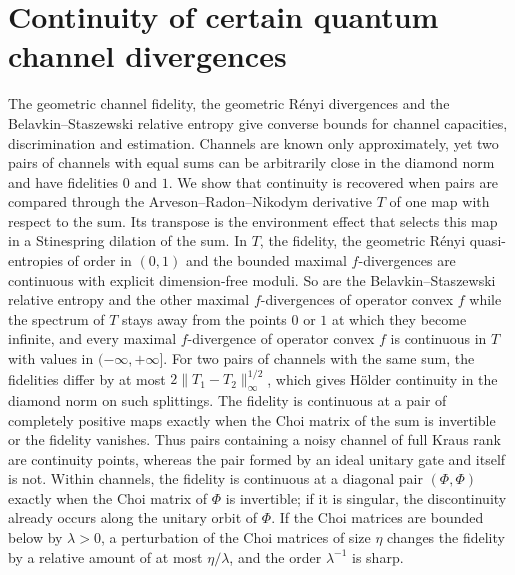 \chapter{Continuity of certain quantum channel divergences}\label{cont:chapter}
\begingroup\renewcommand{\thefootnote}{}\addtocounter{footnote}{-1}\endgroup
{}%
\begingroup

\begin{chaptersummary}
The geometric channel fidelity, the geometric R\'enyi divergences and the Belavkin--Staszewski relative entropy give converse bounds for channel capacities, discrimination and estimation. Channels are known only approximately, yet two pairs of channels with equal sums can be arbitrarily close in the diamond norm and have fidelities $0$ and $1$. We show that continuity is recovered when pairs are compared through the Arveson--Radon--Nikodym derivative $T$ of one map with respect to the sum. Its transpose is the environment effect that selects this map in a Stinespring dilation of the sum. In $T$, the fidelity, the geometric R\'enyi quasi-entropies of order in $(0,1)$ and the bounded maximal $f$-divergences are continuous with explicit dimension-free moduli. So are the Belavkin--Staszewski relative entropy and the other maximal $f$-divergences of operator convex $f$ while the spectrum of $T$ stays away from the points $0$ or $1$ at which they become infinite, and every maximal $f$-divergence of operator convex $f$ is continuous in $T$ with values in $(-\infty,+\infty]$. For two pairs of channels with the same sum, the fidelities differ by at most $2\|T_1-T_2\|_\infty^{1/2}$, which gives H\"older continuity in the diamond norm on such splittings. The fidelity is continuous at a pair of completely positive maps exactly when the Choi matrix of the sum is invertible or the fidelity vanishes. Thus pairs containing a noisy channel of full Kraus rank are continuity points, whereas the pair formed by an ideal unitary gate and itself is not.
Within channels, the fidelity is continuous at a diagonal pair $(\Phi,\Phi)$ exactly when the Choi matrix of $\Phi$ is invertible; if it is singular, the discontinuity already occurs along the unitary orbit of $\Phi$. If the Choi matrices are bounded below by $\lambda>0$, a perturbation of the Choi matrices of size $\eta$ changes the fidelity by a relative amount of at most $\eta/\lambda$, and the order $\lambda^{-1}$ is sharp.
\end{chaptersummary}

